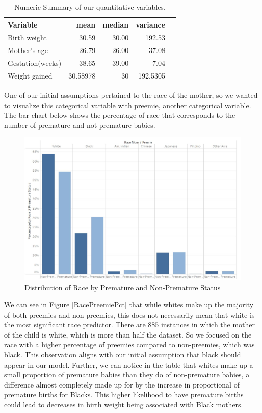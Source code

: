 \documentclass{article}\usepackage[]{graphicx}\usepackage[]{xcolor}
\begin{document}
\begin{enumerate}[a.]
\begin{table}[H]
\centering
\begin{tabular}{lrrrr}
  \hline
  Variable & mean & median & variance \\ 
  \hline
  Birth weight & 30.59 & 30.00 & 192.53\\
  Mother's age & 26.79 & 26.00 & 37.08 \\
  Gestation(weeks) & 38.65 & 39.00 & 7.04 \\ 
  Weight gained & 30.58978 & 30 & 192.5305 \\
  \hline
\end{tabular}
\caption{Numeric Summary of our quantitative variables.}
\end{table}

One of our initial assumptions pertained to the race of the mother, so we wanted to visualize this categorical variable with preemie, another categorical variable. The bar chart below shows the percentage of race that corresponds to the number of premature and not premature babies. 

\begin{figure}
\includegraphics[scale=0.75]{./RacePremiePercent.jpg}
\caption{Distribution of Race by Premature and Non-Premature Status}
\end{figure}

We can see in Figure \ref{RacePreemiePct} that while whites make up the majority of both preemies and non-preemies, this does not necessarily mean that white is the most significant race predictor. There are 885 instances in which the mother of the child is white, which is more than half the dataset. So we focused on the race with a higher percentage of preemies compared to non-preemies, which was black. This observation aligns with our initial assumption that black should appear in our model. Further, we can notice in the table that whites make up a small proportion of premature babies than they do of non-premature babies, a difference almost completely made up for by the increase in proportional of premature births for Blacks. This higher likelihood to have premature births could lead to decreases in birth weight being associated with Black mothers.


\end{enumerate}
\end{document}

